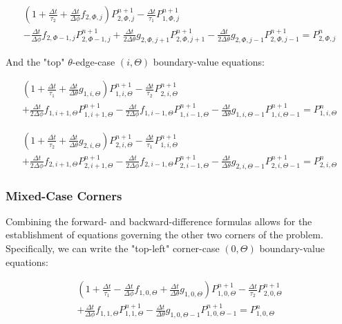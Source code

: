 \documentclass[12pt,a4paper,pagesize=pdftex]{scrartcl}
\begin{document}
\begin{multline*}
    \left(1 + \frac{\Delta t}{\tau_2} + \frac{\Delta t}{\Delta \phi}f_{2,\Phi,j}\right) P^{n+1}_{2,\Phi,j} - \frac{\Delta t}{\tau_1} P^{n+1}_{1,\Phi,j} \\- \frac{\Delta t}{\Delta \phi} f_{2,\Phi-1,j} P^{n+1}_{2,\Phi-1,j} + \frac{\Delta t}{2 \Delta \theta} g_{2,\Phi,j+1} P^{n+1}_{2,\Phi,j+1} - \frac{\Delta t}{2 \Delta \theta} g_{2,\Phi,j-1} P^{n+1}_{2,\Phi,j-1} = P^n_{2,\Phi,j}
\end{multline*}

And the "top" \(\theta\)-edge-case \(\left(i,\Theta\right)\) boundary-value equations:

\begin{multline*}
    \left(1 + \frac{\Delta t}{\tau_1} + \frac{\Delta t}{\Delta \theta} g_{1,i,\Theta}\right) P^{n+1}_{1,i,\Theta} - \frac{\Delta t}{\tau_2} P^{n+1}_{2,i,\Theta} \\+ \frac{\Delta t}{2 \Delta \phi} f_{1,i+1,\Theta} P^{n+1}_{1,i+1,\Theta} - \frac{\Delta t}{2 \Delta \phi} f_{1,i-1,\Theta} P^{n+1}_{1,i-1,\Theta} - \frac{\Delta t}{\Delta \theta} g_{1,i,\Theta-1} P^{n+1}_{1,i,\Theta-1} = P^n_{1,i,\Theta}
\end{multline*}

\begin{multline*}
    \left(1 + \frac{\Delta t}{\tau_2} + \frac{\Delta t}{\Delta \theta} g_{2,i,\Theta}\right) P^{n+1}_{2,i,\Theta} - \frac{\Delta t}{\tau_1} P^{n+1}_{1,i,\Theta} \\+ \frac{\Delta t}{2 \Delta \phi} f_{2,i+1,\Theta} P^{n+1}_{2,i+1,\Theta} - \frac{\Delta t}{2 \Delta \phi} f_{2,i-1,\Theta} P^{n+1}_{2,i-1,\Theta} - \frac{\Delta t}{\Delta \theta} g_{2,i,\Theta-1} P^{n+1}_{2,i,\Theta-1} = P^n_{2,i,\Theta}
\end{multline*}

\subsubsection*{Mixed-Case Corners}
Combining the forward- and backward-difference formulas allows for the establishment of equations governing the other two corners of the problem. Specifically, we can write the "top-left" corner-case \(\left(0,\Theta\right)\) boundary-value equations:

\begin{multline*}
    \left(1 + \frac{\Delta t}{\tau_1} - \frac{\Delta t}{\Delta \phi} f_{1,0,\Theta} + \frac{\Delta t}{\Delta \theta} g_{1,0,\Theta}\right) P^{n+1}_{1,0,\Theta} - \frac{\Delta t}{\tau_2} P^{n+1}_{2,0,\Theta} \\+ \frac{\Delta t}{\Delta \phi} f_{1,1,\Theta} P^{n+1}_{1,1,\Theta} - \frac{\Delta t}{\Delta \theta} g_{1,0,\Theta-1} P^{n+1}_{1,0,\Theta-1} = P^n_{1,0,\Theta}
\end{multline*}
\end{document}
